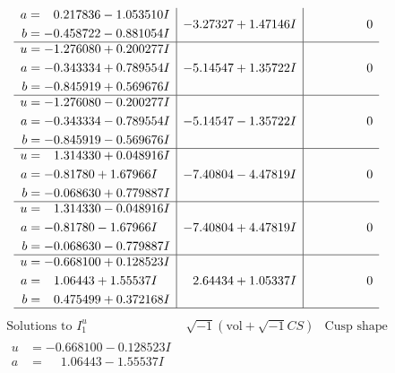 \documentclass[1p]{elsarticle_modified}
\theoremstyle{definition}
\newcommand{\I}{\sqrt{-1}}
\begin{document}
$$\begin{array}{c|c|c}
\begin{aligned}
a &= \phantom{-}0.217836 - 1.053510 I \\
b &= -0.458722 - 0.881054 I\end{aligned}
 & -3.27327 + 1.47146 I & \phantom{-0.000000 } 0 \\ \hline\begin{aligned}
u &= -1.276080 + 0.200277 I \\
a &= -0.343334 + 0.789554 I \\
b &= -0.845919 + 0.569676 I\end{aligned}
 & -5.14547 + 1.35722 I & \phantom{-0.000000 } 0 \\ \hline\begin{aligned}
u &= -1.276080 - 0.200277 I \\
a &= -0.343334 - 0.789554 I \\
b &= -0.845919 - 0.569676 I\end{aligned}
 & -5.14547 - 1.35722 I & \phantom{-0.000000 } 0 \\ \hline\begin{aligned}
u &= \phantom{-}1.314330 + 0.048916 I \\
a &= -0.81780 + 1.67966 I \\
b &= -0.068630 + 0.779887 I\end{aligned}
 & -7.40804 - 4.47819 I & \phantom{-0.000000 } 0 \\ \hline\begin{aligned}
u &= \phantom{-}1.314330 - 0.048916 I \\
a &= -0.81780 - 1.67966 I \\
b &= -0.068630 - 0.779887 I\end{aligned}
 & -7.40804 + 4.47819 I & \phantom{-0.000000 } 0 \\ \hline\begin{aligned}
u &= -0.668100 + 0.128523 I \\
a &= \phantom{-}1.06443 + 1.55537 I \\
b &= \phantom{-}0.475499 + 0.372168 I\end{aligned}
 & \phantom{-}2.64434 + 1.05337 I & \phantom{-0.000000 } 0\\
 \hline 
 \end{array}$$\newpage$$\begin{array}{c|c|c}  
\text{Solutions to }I^u_{1}& \I (\text{vol} + \sqrt{-1}CS) & \text{Cusp shape}\\
 \hline 
\begin{aligned}
u &= -0.668100 - 0.128523 I \\
a &= \phantom{-}1.06443 - 1.55537 I \\

\end{aligned}
\end{array}$$
\end{document}
